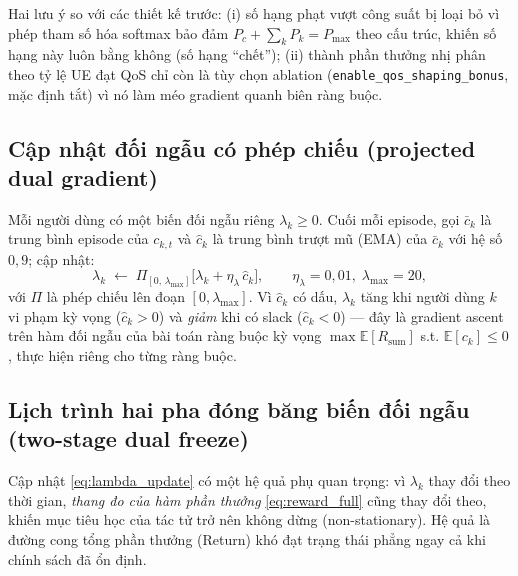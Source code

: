 Hai lưu ý so với các thiết kế trước: (i) số hạng phạt vượt công suất bị
loại bỏ vì phép tham số hóa softmax bảo đảm
$P_c + \sum_k P_k = P_{\max}$ theo cấu trúc, khiến số hạng này luôn
bằng không (số hạng ``chết''); (ii) thành phần thưởng nhị phân theo tỷ
lệ UE đạt QoS chỉ còn là tùy chọn ablation
(\texttt{enable\_qos\_shaping\_bonus}, mặc định tắt) vì nó làm méo
gradient quanh biên ràng buộc.

\subsection{Cập nhật đối ngẫu có phép chiếu (projected dual gradient)}
\label{sec:dual_update}

Mỗi người dùng có một biến đối ngẫu riêng $\lambda_k \geq 0$. Cuối mỗi
episode, gọi $\bar{c}_k$ là trung bình episode của $c_{k,t}$ và
$\hat{c}_k$ là trung bình trượt mũ (EMA) của $\bar{c}_k$ với hệ số
$0{,}9$; cập nhật:
\begin{equation}
\lambda_k \;\leftarrow\; \Pi_{[0,\,\lambda_{\max}]}
\big[\lambda_k + \eta_{\lambda}\, \hat{c}_k\big],
\qquad \eta_{\lambda} = 0{,}01,\; \lambda_{\max} = 20,
\label{eq:lambda_update}
\end{equation}
với $\Pi$ là phép chiếu lên đoạn $[0, \lambda_{\max}]$. Vì $\hat{c}_k$
có dấu, $\lambda_k$ tăng khi người dùng $k$ vi phạm kỳ vọng
($\hat{c}_k > 0$) và \emph{giảm} khi có slack ($\hat{c}_k < 0$) --- đây
là gradient ascent trên hàm đối ngẫu của bài toán ràng buộc kỳ vọng
$\max \mathbb{E}[R_{\text{sum}}]$ s.t. $\mathbb{E}[c_k] \leq 0$, thực
hiện riêng cho từng ràng buộc.

\subsection{Lịch trình hai pha đóng băng biến đối ngẫu (two-stage dual freeze)}
\label{sec:freeze_lambda}

Cập nhật \eqref{eq:lambda_update} có một hệ quả phụ quan
trọng: vì $\lambda_k$ thay đổi theo thời gian, \emph{thang đo của hàm
phần thưởng} \eqref{eq:reward_full} cũng thay đổi theo, khiến mục tiêu
học của tác tử trở nên không dừng (non-stationary). Hệ quả là đường
cong tổng phần thưởng (Return) khó đạt trạng thái phẳng ngay cả khi
chính sách đã ổn định.

